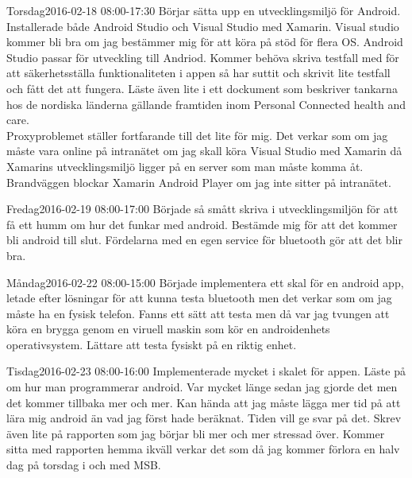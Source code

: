 \documentclass[a4paper,oneside]{book}
\begin{document}
\begin{diary}{Torsdag}{2016-02-18 08:00-17:30}
	Börjar sätta upp en utvecklingsmiljö för Android. Installerade både Android Studio och Visual Studio med Xamarin. Visual studio kommer bli bra om jag bestämmer mig för att köra på stöd för flera OS. Android Studio passar för utveckling till Andriod. Kommer behöva skriva testfall med för att säkerhetsställa funktionaliteten i appen så har suttit och skrivit lite testfall och fått det att fungera. Läste även lite i ett dockument som beskriver tankarna hos de nordiska länderna gällande framtiden inom Personal Connected health and care.\\
	Proxyproblemet ställer fortfarande till det lite för mig. Det verkar som om jag måste vara online på intranätet om jag skall köra Visual Studio med Xamarin då Xamarins utvecklingsmiljö ligger på en server som man måste komma åt. Brandväggen blockar Xamarin Android Player om jag inte sitter på intranätet.
\end{diary}

\begin{diary}{Fredag}{2016-02-19 08:00-17:00}
	Började så smått skriva i utvecklingsmiljön för att få ett humm om hur det funkar med android. Bestämde mig för att det kommer bli android till slut. Fördelarna med en egen service för bluetooth gör att det blir bra.
\end{diary}
\newpage

\begin{diary}{Måndag}{2016-02-22 08:00-15:00}
	Började implementera ett skal för en android app, letade efter lösningar för att kunna testa bluetooth men det verkar som om jag måste ha en fysisk telefon. Fanns ett sätt att testa men då var jag tvungen att köra en brygga genom en viruell maskin som kör en androidenhets operativsystem. Lättare att testa fysiskt på en riktig enhet.
\end{diary}

\begin{diary}{Tisdag}{2016-02-23 08:00-16:00}
	Implementerade mycket i skalet för appen. Läste på om hur man programmerar android. Var mycket länge sedan jag gjorde det men det kommer tillbaka mer och mer. Kan hända att jag måste lägga mer tid på att lära mig android än vad jag först hade beräknat. Tiden vill ge svar på det. Skrev även lite på rapporten som jag börjar bli mer och mer stressad över. Kommer sitta med rapporten hemma ikväll verkar det som då jag kommer förlora en halv dag på torsdag i och med MSB.
\end{diary}
\end{document}

